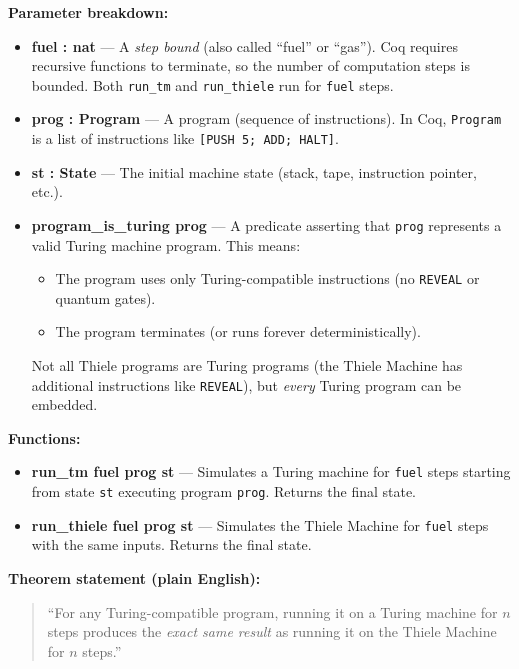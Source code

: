 \textbf{Parameter breakdown:}
\begin{itemize}
    \item \textbf{fuel : nat} — A \textit{step bound} (also called ``fuel'' or ``gas''). Coq requires recursive functions to terminate, so the number of computation steps is bounded. Both \texttt{run\_tm} and \texttt{run\_thiele} run for \texttt{fuel} steps.
    
    \item \textbf{prog : Program} — A program (sequence of instructions). In Coq, \texttt{Program} is a list of instructions like \texttt{[PUSH 5; ADD; HALT]}.
    
    \item \textbf{st : State} — The initial machine state (stack, tape, instruction pointer, etc.).
    
    \item \textbf{program\_is\_turing prog} — A predicate asserting that \texttt{prog} represents a valid Turing machine program. This means:
    \begin{itemize}
        \item The program uses only Turing-compatible instructions (no \texttt{REVEAL} or quantum gates).
        \item The program terminates (or runs forever deterministically).
    \end{itemize}
    Not all Thiele programs are Turing programs (the Thiele Machine has additional instructions like \texttt{REVEAL}), but \textit{every} Turing program can be embedded.
\end{itemize}

\textbf{Functions:}
\begin{itemize}
    \item \textbf{run\_tm fuel prog st} — Simulates a Turing machine for \texttt{fuel} steps starting from state \texttt{st} executing program \texttt{prog}. Returns the final state.
    
    \item \textbf{run\_thiele fuel prog st} — Simulates the Thiele Machine for \texttt{fuel} steps with the same inputs. Returns the final state.
\end{itemize}

\textbf{Theorem statement (plain English):}
\begin{quote}
``For any Turing-compatible program, running it on a Turing machine for $n$ steps produces the \textit{exact same result} as running it on the Thiele Machine for $n$ steps.''
\end{quote}

